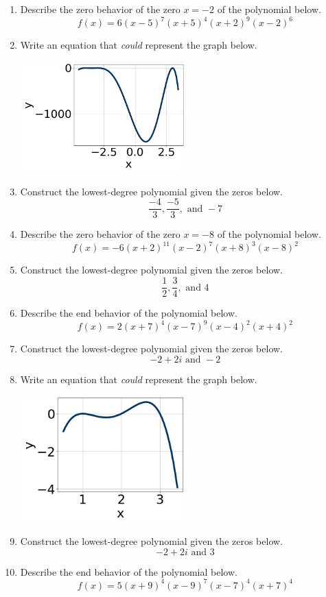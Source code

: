 \documentclass[14pt]{extbook}
\begin{document}
\begin{enumerate}
\item{
Describe the zero behavior of the zero $x = -2$ of the polynomial below.\[ f(x) = 6(x - 5)^{7}(x + 5)^{4}(x + 2)^{9}(x - 2)^{6} \]} \newpage
\item{
Write an equation that \textit{could} represent the graph below.
\begin{center}
    \includegraphics[width=0.5\textwidth]{../Figures/polyGraphToFunctionB.png}
\end{center}
} \newpage
\item{
Construct the lowest-degree polynomial given the zeros below.\[ \frac{-4}{3}, \frac{-5}{3}, \text{ and } -7 \]} \newpage
\item{
Describe the zero behavior of the zero $x = -8$ of the polynomial below.\[ f(x) = -6(x + 2)^{11}(x - 2)^{7}(x + 8)^{3}(x - 8)^{2} \]} \newpage
\item{
Construct the lowest-degree polynomial given the zeros below.\[ \frac{1}{2}, \frac{3}{4}, \text{ and } 4 \]} \newpage
\item{
Describe the end behavior of the polynomial below.\[ f(x) = 2(x + 7)^{4}(x - 7)^{9}(x - 4)^{2}(x + 4)^{2} \]} \newpage
\item{
Construct the lowest-degree polynomial given the zeros below.\[ -2 + 2 i \text{ and } -2 \]} \newpage
\item{
Write an equation that \textit{could} represent the graph below.
\begin{center}
    \includegraphics[width=0.5\textwidth]{../Figures/polyGraphToFunctionCopyB.png}
\end{center}
} \newpage
\item{
Construct the lowest-degree polynomial given the zeros below.\[ -2 + 2 i \text{ and } 3 \]} \newpage
\item{
Describe the end behavior of the polynomial below.\[ f(x) = 5(x + 9)^{4}(x - 9)^{7}(x - 7)^{4}(x + 7)^{4} \]} \newpage
\end{enumerate}
\end{document}
